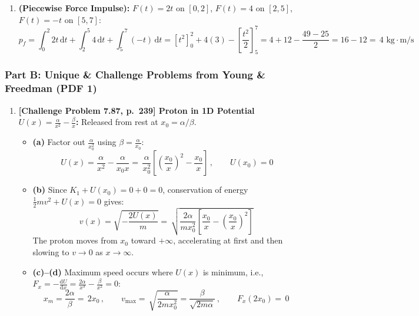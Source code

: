 \documentclass[11pt,a4paper,openany,oneside]{book}
\newcommand{\eqbox}[1]{\boxed{\,#1\,}}
\newcommand{\dd}{\,\mathrm{d}}
\newcommand{\diff}{\mathrm{d}}
\numberwithin{equation}{chapter}
\begin{document}
\begin{enumerate}[label=\textbf{Ex.\ 6.\arabic*},leftmargin=3.5em]
  \item \textbf{(Piecewise Force Impulse):} $F(t) = 2t$ on $[0,2]$, $F(t)=4$ on $[2,5]$, $F(t)=-t$ on $[5,7]$:
  \begin{equation*}
    p_f = \int_0^2 2t\dd t + \int_2^5 4\dd t + \int_5^7 (-t)\dd t = [t^2]_0^2 + 4(3) - \left[\frac{t^2}{2}\right]_5^7 = 4 + 12 - \frac{49-25}{2} = 16 - 12 = \eqbox{4\text{ kg}\cdot\text{m/s}}
  \end{equation*}
\end{enumerate}

\subsubsection{Part B: Unique \& Challenge Problems from Young \& Freedman (PDF 1)}

\begin{enumerate}[label=\textbf{Prob.\ \arabic*},leftmargin=4.2em]
  \setcounter{enumi}{0}
  \item \textbf{[Challenge Problem 7.87, p.\ 239] Proton in 1D Potential $U(x) = \frac{\alpha}{x^2} - \frac{\beta}{x}$:}
  Released from rest at $x_0 = \alpha/\beta$.
  \begin{itemize}
    \item \textbf{(a)} Factor out $\frac{\alpha}{x_0^2}$ using $\beta = \frac{\alpha}{x_0}$:
    \begin{equation*}
      U(x) = \frac{\alpha}{x^2} - \frac{\alpha}{x_0 x} = \eqbox{\frac{\alpha}{x_0^2}\!\left[\left(\frac{x_0}{x}\right)^2 - \frac{x_0}{x}\right]}, \qquad U(x_0) = 0
    \end{equation*}
    \item \textbf{(b)} Since $K_1 + U(x_0) = 0 + 0 = 0$, conservation of energy $\frac{1}{2}mv^2 + U(x) = 0$ gives:
    \begin{equation*}
      v(x) = \sqrt{-\frac{2U(x)}{m}} = \eqbox{\sqrt{\frac{2\alpha}{m x_0^2}\!\left[\frac{x_0}{x} - \left(\frac{x_0}{x}\right)^2\right]}}
    \end{equation*}
    The proton moves from $x_0$ toward $+\infty$, accelerating at first and then slowing to $v\to 0$ as $x\to\infty$.
    \item \textbf{(c)--(d)} Maximum speed occurs where $U(x)$ is minimum, i.e., $F_x = -\frac{\diff U}{\diff x} = \frac{2\alpha}{x^3} - \frac{\beta}{x^2} = 0$:
    \begin{equation*}
      x_m = \frac{2\alpha}{\beta} = \eqbox{2x_0}, \qquad v_{\max} = \eqbox{\sqrt{\frac{\alpha}{2m x_0^2}} = \frac{\beta}{\sqrt{2m\alpha}}}, \qquad F_x(2x_0) = \eqbox{0}

\end{equation*}
\end{itemize}
\end{enumerate}
\end{document}
